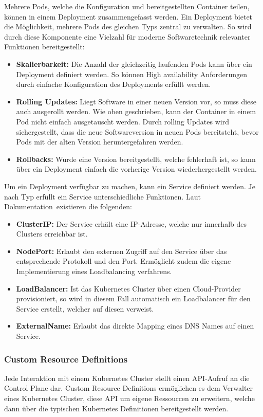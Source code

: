 Mehrere Pods, welche die Konfiguration und bereitgestellten Container teilen, können in einem Deployment zusammengefasst werden.
Ein Deployment bietet die Möglichkeit, mehrere Pods des gleichen Typs zentral zu verwalten.
So wird durch diese Komponente eine Vielzahl für moderne Softwaretechnik relevanter Funktionen bereitgestellt:

\begin{itemize}
    \item \textbf{Skalierbarkeit:} Die Anzahl der gleichzeitig laufenden Pods kann über ein Deployment definiert werden.
    So können High availability Anforderungen durch einfache Konfiguration des Deployments erfüllt werden.
    \item \textbf{Rolling Updates:} Liegt Software in einer neuen Version vor, so muss diese auch ausgerollt werden.
    Wie oben geschrieben, kann der Container in einem Pod nicht einfach ausgetauscht werden.
    Durch rolling Updates wird sichergestellt, dass die neue Softwareversion in neuen Pods bereitsteht, bevor Pods mit der alten Version heruntergefahren werden.
    \item \textbf{Rollbacks:} Wurde eine Version bereitgestellt, welche fehlerhaft ist, so kann über ein Deployment einfach die vorherige Version wiederhergestellt werden.
\end{itemize}

Um ein Deployment verfügbar zu machen, kann ein Service definiert werden.
Je nach Typ erfüllt ein Service unterschiedliche Funktionen.
Laut Dokumentation~\cite{kubernetesservices}existieren die folgenden:

\begin{itemize}
    \item \textbf{ClusterIP:} Der Service erhält eine IP-Adresse, welche nur innerhalb des Clusters erreichbar ist.
    \item \textbf{NodePort:} Erlaubt den externen Zugriff auf den Service über das entsprechende Protokoll und den Port.
    Ermöglicht zudem die eigene Implementierung eines Loadbalancing verfahrens.
    \item \textbf{LoadBalancer:} Ist das Kubernetes Cluster über einen Cloud-Provider provisioniert, so wird in diesem Fall automatisch ein Loadbalancer für den Service erstellt, welcher auf diesen verweist.
    \item \textbf{ExternalName:} Erlaubt das direkte Mapping eines DNS Names auf einen Service.
\end{itemize}

\subsubsection{Custom Resource Definitions}
Jede Interaktion mit einem Kubernetes Cluster stellt einen API-Aufruf an die Control Plane dar.
Custom Resource Definitions ermöglichen es dem Verwalter eines Kubernetes Cluster, diese API um eigene Ressourcen zu erweitern, welche dann über die typischen Kubernetes Definitionen bereitgestellt werden.

\newpage
